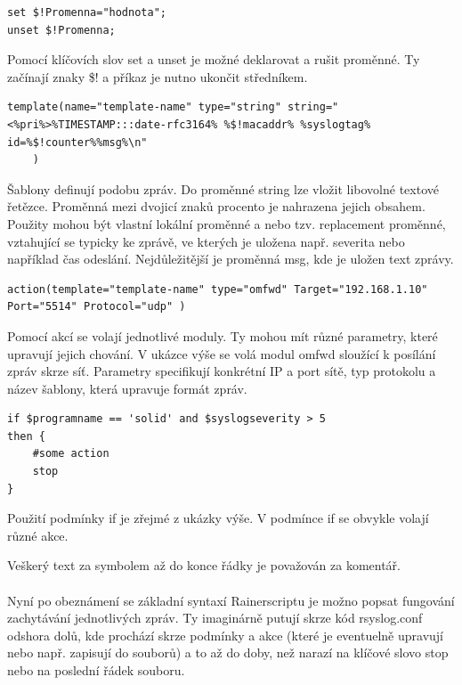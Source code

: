 \documentclass[thesis=B,czech]{FITthesis}[2012/06/26]
\begin{document}
\begin{lstlisting}[style=RainerScriptSimpleStyle]
set $!Promenna="hodnota";
unset $!Promenna;
\end{lstlisting}
Pomocí klíčovích slov set a unset je možné deklarovat a rušit proměnné. Ty začínají znaky \$! a příkaz je nutno ukončit středníkem.

\begin{lstlisting}[style=RainerScriptSimpleStyle]
template(name="template-name" type="string" string="<%pri%>%TIMESTAMP:::date-rfc3164% %$!macaddr% %syslogtag% id=%$!counter%%msg%\n"
	)
\end{lstlisting}
Šablony definují podobu zpráv. Do proměnné string lze vložit libovolné textové řetězce. Proměnná mezi dvojicí znaků procento je nahrazena jejich obsahem. Použity mohou být vlastní lokální proměnné a nebo tzv. replacement proměnné, vztahující se typicky ke zprávě, ve kterých je uložena např. severita nebo například čas odeslání. Nejdůležitější je proměnná msg, kde je uložen text zprávy.

\begin{lstlisting}[style=RainerScriptSimpleStyle]
action(template="template-name" type="omfwd" Target="192.168.1.10" Port="5514" Protocol="udp" )
\end{lstlisting}

Pomocí akcí se volají jednotlivé moduly. Ty mohou mít různé parametry, které upravují jejich chování. V ukázce výše se volá modul omfwd sloužící k posílání zpráv skrze síť. Parametry specifikují konkrétní IP a port sítě, typ protokolu a název šablony, která upravuje formát zpráv.

\begin{lstlisting}[style=RainerScriptSimpleStyle]
if $programname == 'solid' and $syslogseverity > 5
then {
	#some action
	stop
}
\end{lstlisting}
	
Použití podmínky if je zřejmé z ukázky výše. V podmínce if se obvykle volají různé akce.

Veškerý text za symbolem \uv{\#} až do konce řádky je považován za komentář.
\\
\\
Nyní po obeznámení se základní syntaxí Rainerscriptu je možno popsat fungování zachytávání jednotlivých zpráv. Ty imaginárně putují skrze kód rsyslog.conf odshora dolů, kde prochází skrze podmínky a akce (které je eventuelně upravují nebo např. zapisují do souborů) a to až do doby, než narazí na klíčové slovo stop nebo na poslední řádek souboru.
\end{document}
